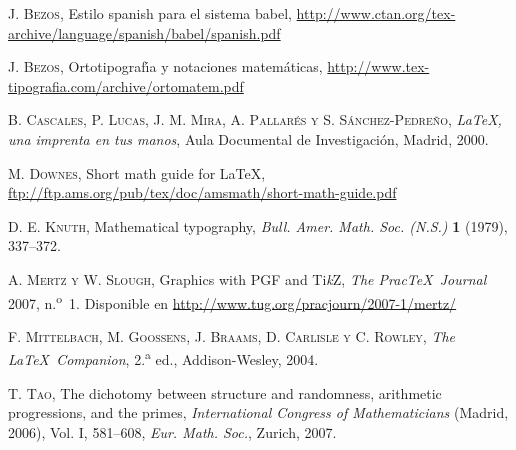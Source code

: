 \documentclass[autocontact]{gaceta}
\theoremstyle{definition} \newtheorem{defn}[thm]{Definición}
\theoremstyle{definition} \newtheorem{ejemplo}[thm]{Ejemplo}
\theoremstyle{definition} \newtheorem{ejercicio}[thm]{Ejercicio}
\begin{document}
\begin{thebibliography}{9}

\textsc{J. Bezos}, 
Estilo spanish para el sistema babel,
\url{http://www.ctan.org/tex-archive/language/spanish/babel/spanish.pdf}

\textsc{J. Bezos}, 
Ortotipograf\'{\i}a y notaciones matem\'aticas,
\url{http://www.tex-tipografia.com/archive/ortomatem.pdf}

\textsc{B. Cascales, P. Lucas, J. M. Mira, A. Pallar\'es y S. S\'anchez-Pedre\~no}, 
\textit{LaTeX, una imprenta en tus manos}, 
Aula Documental de Investigaci\'on, Madrid, 2000.

\textsc{M. Downes},
Short math guide for \LaTeX,
\url{ftp://ftp.ams.org/pub/tex/doc/amsmath/short-math-guide.pdf}

\textsc{D. E. Knuth}, 
Mathematical typography, 
\textit{Bull. Amer. Math. Soc. (N.S.)} 
\textbf{1} (1979), 337--372. 

\textsc{A. Mertz y W. Slough},
Graphics with PGF and Ti\textit{k}Z,
\textit{The Prac\TeX\ Journal} 2007, n.\textsuperscript{o}~1.
Disponible en
\url{http://www.tug.org/pracjourn/2007-1/mertz/}

\textsc{F. Mittelbach, M. Goossens, J. Braams, D. Carlisle y C. Rowley}, 
\textit{The \LaTeX\ Companion}, 
2.\textsuperscript{a} ed., 
Addison-Wesley, 2004. 

\textsc{T. Tao}, 
The dichotomy between structure and randomness, arithmetic progressions, and the primes, 
\textit{International Congress of Mathematicians} (Madrid, 2006), 
Vol. I, 581--608, \textit{Eur. Math. Soc.}, Zurich, 2007.

\end{thebibliography}

\end{document}
